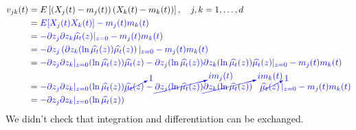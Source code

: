 \documentclass[a4paper,11pt]{article}
\begin{document}
{ \small
        \begin{align*}
            v_{j k}(t) & =E\left[\left(X_{j}(t)-m_{j}(t)\right)\left(X_{k}(t)-m_{k}(t)\right)\right], \quad j, k=1, \ldots, d                                                                                                                                                                                                                                      \\
                       & = \textcolor{blue}{ E[X_{j}(t)X_{k}(t)] - m_{j}(t)m_{k}(t)}                                                                                                                                                                                                                                                                               \\
                       & = \textcolor{blue}{  -\partial z_{j} \partial z_{k} \widehat{\mu_{t}}(z)|_{z=0} - m_{j}(t)m_{k}(t)}                                                                                                                                                                                                                                       \\
                       & = \textcolor{blue}{  -\partial z_{j} \left( \partial z_{k} (\ln \widehat{\mu_{t}}(z)) \widehat{\mu_{t}}(z) \right) |_{z=0} - m_{j}(t)m_{k}(t)}                                                                                                                                                                                            \\
                       & = \textcolor{blue}{  -\partial z_{j} \partial z_{k}|_{z=0} (\ln \widehat{\mu_{t}}(z)) \widehat{\mu_{t}}(z)   -\partial z_{j}( \ln\widehat{\mu_{t}}(z) )\partial z_{k}( \ln\widehat{\mu_{t}}(z) )\widehat{\mu_{t}}(z)|_{z=0} - m_{j}(t)m_{k}(t)}                                                                                           \\
                       & = \textcolor{blue}{  -\partial z_{j} \partial z_{k}|_{z=0} (\ln \widehat{\mu_{t}}(z)) \cancelto{1}{\widehat{\mu_{t}}(z)}   -\cancelto{i m_{j}(t)}{\partial z_{j}( \ln\widehat{\mu_{t}}(z) )}\cancelto{im_{k}(t)}{\partial z_{k}( \ln\widehat{\mu_{t}}(z) )} \hspace{0.3cm}\cancelto{1}{\widehat{\mu_{t}}(z)}\,|_{z=0} - m_{j}(t)m_{k}(t)} \\
                       & = \textcolor{blue}{  -\partial z_{j} \partial z_{k}|_{z=0} (\ln \widehat{\mu_{t}}(z)) }
        \end{align*}
        We didn't check that integration and differentiation can be exchanged.
    }
\end{document}
